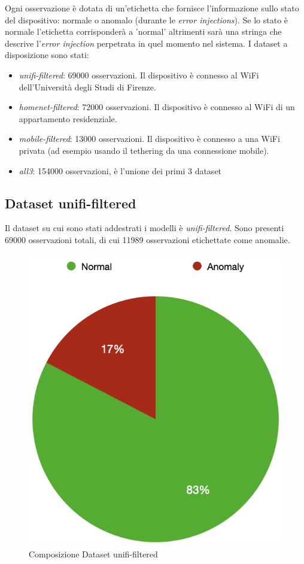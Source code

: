Ogni osservazione \`e dotata di un'etichetta che fornisce l'informazione sullo stato del dispositivo: normale o anomalo (durante le \textit{error injections}). Se lo stato \`e normale l'etichetta corrisponder\`a a 'normal' altrimenti sar\`a una stringa che descrive l'\textit{error injection} perpetrata in quel momento nel sistema.
I dataset a disposizione sono stati:
\begin{itemize}
    \item \textit{unifi-filtered}: 69000 osservazioni. Il dispositivo \`e connesso al WiFi dell'Universit\`a degli Studi di Firenze.
    \item \textit{homenet-filtered}: 72000 osservazioni. Il dispositivo \`e connesso al WiFi di un appartamento residenziale.
    \item \textit{mobile-filtered}: 13000 osservazioni. Il dispositivo \`e connesso a una WiFi privata (ad esempio usando il tethering da una connessione mobile).
    \item \textit{all3}: 154000 osservazioni, \`e l'unione dei primi 3 dataset
\end{itemize}


\subsection{Dataset unifi-filtered}
Il dataset su cui sono stati addestrati i modelli \`e \textit{unifi-filtered}. Sono presenti 69000 osservazioni totali, di cui 11989 osservazioni etichettate come anomalie.

\begin{figure}[H]
    \centering
    \includegraphics[width=0.5\linewidth]{balance_unifi.png}
    \caption{Composizione Dataset unifi-filtered}
    \label{fig:enter-label}
\end{figure}



